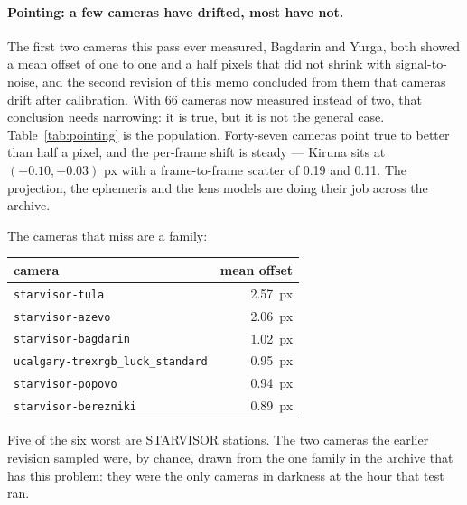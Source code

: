 \documentclass[11pt,a4paper]{article}
\begin{document}
\paragraph{Pointing: a few cameras have drifted, most have not.} The first two
cameras this pass ever measured, Bagdarin and Yurga, both showed a mean offset
of one to one and a half pixels that did not shrink with signal-to-noise, and
the second revision of this memo concluded from them that cameras drift after
calibration. With 66 cameras now measured instead of two, that conclusion needs
narrowing: it is true, but it is not the general case.
Table~\ref{tab:pointing} is the population. Forty-seven cameras point true to
better than half a pixel, and the per-frame shift is steady --- Kiruna sits at
$(+0.10,+0.03)$ px with a frame-to-frame scatter of \num{0.19} and \num{0.11}.
The projection, the ephemeris and the lens models are doing their job across
the archive.

The cameras that miss are a family:

\begin{center}\small
\begin{tabular}{lr}
\toprule
camera & mean offset \\
\midrule
\texttt{starvisor-tula} & \SI{2.57}{px} \\
\texttt{starvisor-azevo} & \SI{2.06}{px} \\
\texttt{starvisor-bagdarin} & \SI{1.02}{px} \\
\texttt{ucalgary-trexrgb\_luck\_standard} & \SI{0.95}{px} \\
\texttt{starvisor-popovo} & \SI{0.94}{px} \\
\texttt{starvisor-berezniki} & \SI{0.89}{px} \\
\bottomrule
\end{tabular}
\end{center}

\noindent Five of the six worst are STARVISOR stations. The two cameras the
earlier revision sampled were, by chance, drawn from the one family in the
archive that has this problem: they were the only cameras in darkness at the
hour that test ran.
\end{document}
